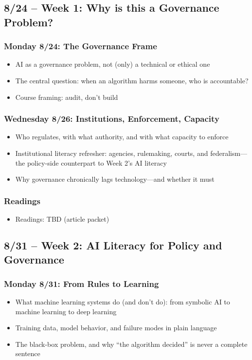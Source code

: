 \documentclass[12pt]{article}
\begin{document}
\subsection*{8/24 -- Week 1: Why is this a Governance Problem?}
    \subsubsection*{Monday 8/24: The Governance Frame}
        \begin{itemize}
            \item AI as a governance problem, not (only) a technical or ethical one
            \item The central question: when an algorithm harms someone, who is accountable?
            \item Course framing: audit, don't build
        \end{itemize}
    \subsubsection*{Wednesday 8/26: Institutions, Enforcement, Capacity}
        \begin{itemize}
            \item Who regulates, with what authority, and with what capacity to enforce
            \item Institutional literacy refresher: agencies, rulemaking, courts, and federalism---the policy-side counterpart to Week 2's AI literacy
            \item Why governance chronically lags technology---and whether it must
        \end{itemize}
    \subsubsection*{Readings}
        \begin{itemize}
            \item Readings: TBD (article packet)
        \end{itemize}

\subsection*{8/31 -- Week 2: AI Literacy for Policy and Governance}
    \subsubsection*{Monday 8/31: From Rules to Learning}
        \begin{itemize}
            \item What machine learning systems do (and don't do): from symbolic AI to machine learning to deep learning
            \item Training data, model behavior, and failure modes in plain language
            \item The black-box problem, and why ``the algorithm decided'' is never a complete sentence
        \end{itemize}
\end{document}
